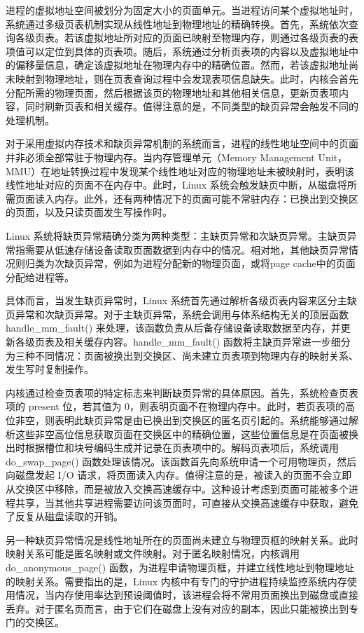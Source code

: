 进程的虚拟地址空间被划分为固定大小的页面单元。当进程访问某个虚拟地址时，系统通过多级页表机制实现从线性地址到物理地址的精确转换。首先，系统依次查询各级页表。若该虚拟地址所对应的页面已映射至物理内存，则通过各级页表的表项值可以定位到具体的页表项。随后，系统通过分析页表项的内容以及虚拟地址中的偏移量信息，确定该虚拟地址在物理内存中的精确位置。然而，若该虚拟地址尚未映射到物理地址，则在页表查询过程中会发现表项信息缺失。此时，内核会首先分配所需的物理页面，然后根据该页的物理地址和其他相关信息，更新页表项内容，同时刷新页表和相关缓存。值得注意的是，不同类型的缺页异常会触发不同的处理机制。

对于采用虚拟内存技术和缺页异常机制的系统而言，进程的线性地址空间中的页面并非必须全部常驻于物理内存。当内存管理单元（Memory Management Unit，MMU）在地址转换过程中发现某个线性地址对应的物理地址未被映射时，表明该线性地址对应的页面不在内存中。此时，Linux 系统会触发缺页中断，从磁盘将所需页面读入内存。此外，还有两种情况下的页面可能不常驻内存：已换出到交换区的页面，以及只读页面发生写操作时。

Linux 系统将缺页异常精确分类为两种类型：主缺页异常和次缺页异常。主缺页异常指需要从低速存储设备读取页面数据到内存中的情况。相对地，其他缺页异常情况则归类为次缺页异常，例如为进程分配新的物理页面，或将page cache中的页面分配给进程等。

具体而言，当发生缺页异常时，Linux 系统首先通过解析各级页表内容来区分主缺页异常和次缺页异常。对于主缺页异常，系统会调用与体系结构无关的顶层函数 handle\_mm\_fault() 来处理，该函数负责从后备存储设备读取数据至内存，并更新各级页表及相关缓存内容。handle\_mm\_fault() 函数将主缺页异常进一步细分为三种不同情况：页面被换出到交换区、尚未建立页表项到物理内存的映射关系、发生写时复制操作。

内核通过检查页表项的特定标志来判断缺页异常的具体原因。首先，系统检查页表项的 present 位，若其值为 0，则表明页面不在物理内存中。此时，若页表项的高位非空，则表明此缺页异常是由已换出到交换区的匿名页引起的。系统能够通过解析这些非空高位信息获取页面在交换区中的精确位置，这些位置信息是在页面被换出时根据槽位和块号编码生成并记录在页表项中的。解码页表项后，系统调用 do\_swap\_page() 函数处理该情况。该函数首先向系统申请一个可用物理页，然后向磁盘发起 I/O 请求，将页面读入内存。值得注意的是，被读入的页面不会立即从交换区中移除，而是被放入交换高速缓存中。这种设计考虑到页面可能被多个进程共享，当其他共享进程需要访问该页面时，可直接从交换高速缓存中获取，避免了反复从磁盘读取的开销。

另一种缺页异常情况是线性地址所在的页面尚未建立与物理页框的映射关系。此时映射关系可能是匿名映射或文件映射。对于匿名映射情况，内核调用 do\_anonymous\_page() 函数，为进程申请物理页框，并建立线性地址到物理地址的映射关系。需要指出的是，Linux 内核中有专门的守护进程持续监控系统内存使用情况，当内存使用率达到预设阈值时，该进程会将不常用页面换出到磁盘或直接丢弃。对于匿名页而言，由于它们在磁盘上没有对应的副本，因此只能被换出到专门的交换区。


